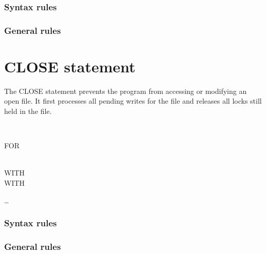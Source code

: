 \subsubsection{Syntax rules}

\subsubsection{General rules}

\section{CLOSE statement}

The CLOSE statement prevents the program from accessing or modifying an open file. It first processes all pending writes for the file and releases all locks still held in the file.

\begin{syntax}
  \begin{1=}
    \filename
    \begin{0-1}
      \begin{1=}
         \\
      \end{1=}
      \begin{0-1}
        FOR 
      \end{0-1} \\

      WITH   \\
      WITH 
    \end{0-1}
  \end{1=} \ldots
\end{syntax}

\begin{syntax}[\miscextcolour]
\end{syntax}

\subsubsection{Syntax rules}

\subsubsection{General rules}

